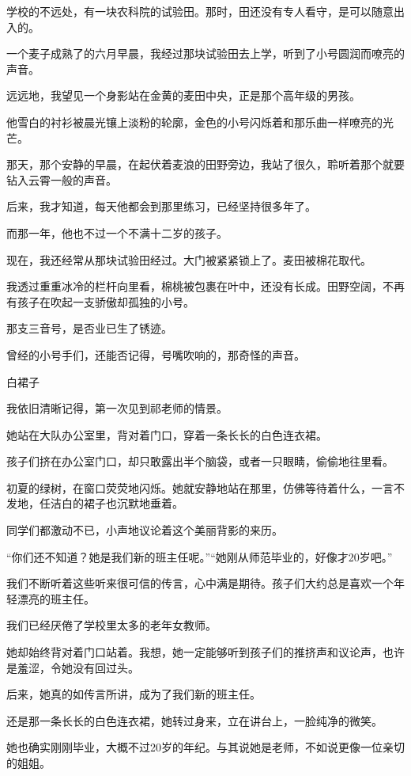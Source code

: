 \documentclass[12pt,a4paper]{article}
\newcommand{\subpart}[1]{
	\begingroup \par
	\vspace{1ex} \centering #1
	\par \endgroup \nopagebreak[4]
}
\begin{document}
		学校的不远处，有一块农科院的试验田。那时，田还没有专人看守，是可以随意出入的。\par
		一个麦子成熟了的六月早晨，我经过那块试验田去上学，听到了小号圆润而嘹亮的声音。\par
		远远地，我望见一个身影站在金黄的麦田中央，正是那个高年级的男孩。\par
		他雪白的衬衫被晨光镶上淡粉的轮廓，金色的小号闪烁着和那乐曲一样嘹亮的光芒。

		那天，那个安静的早晨，在起伏着麦浪的田野旁边，我站了很久，聆听着那个就要钻入云霄一般的声音。

		后来，我才知道，每天他都会到那里练习，已经坚持很多年了。\par
		而那一年，他也不过一个不满十二岁的孩子。

		现在，我还经常从那块试验田经过。大门被紧紧锁上了。麦田被棉花取代。\par
		我透过重重冰冷的栏杆向里看，棉桃被包裹在叶中，还没有长成。田野空阔，不再有孩子在吹起一支骄傲却孤独的小号。

		那支三音号，是否业已生了锈迹。\par
		曾经的小号手们，还能否记得，号嘴吹响的，那奇怪的声音。

		\subpart{白裙子}

		我依旧清晰记得，第一次见到祁老师的情景。

		她站在大队办公室里，背对着门口，穿着一条长长的白色连衣裙。

		孩子们挤在办公室门口，却只敢露出半个脑袋，或者一只眼睛，偷偷地往里看。\par
		初夏的绿树，在窗口荧荧地闪烁。她就安静地站在那里，仿佛等待着什么，一言不发地，任洁白的裙子也沉默地垂着。

		同学们都激动不已，小声地议论着这个美丽背影的来历。\par
		“你们还不知道？她是我们新的班主任呢。”“她刚从师范毕业的，好像才20岁吧。”\par
		我们不断听着这些听来很可信的传言，心中满是期待。孩子们大约总是喜欢一个年轻漂亮的班主任。\par
		我们已经厌倦了学校里太多的老年女教师。

		她却始终背对着门口站着。我想，她一定能够听到孩子们的推挤声和议论声，也许是羞涩，令她没有回过头。\par
		后来，她真的如传言所讲，成为了我们新的班主任。\par
		还是那一条长长的白色连衣裙，她转过身来，立在讲台上，一脸纯净的微笑。\par
		她也确实刚刚毕业，大概不过20岁的年纪。与其说她是老师，不如说更像一位亲切的姐姐。
\end{document}
